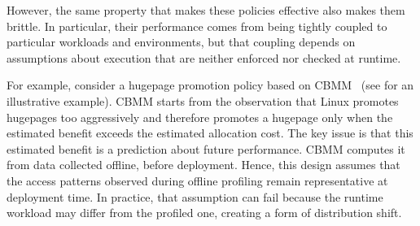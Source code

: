 
However, the same property that makes these policies effective also makes them brittle. In particular, their performance comes from being tightly coupled to particular workloads and environments, but that coupling depends on assumptions about execution that are neither enforced nor checked at runtime.

For example, consider a hugepage promotion policy based on CBMM~\cite{cbmm-atc22} (see  for an illustrative example). CBMM starts from the observation that Linux promotes hugepages too aggressively and  therefore promotes a hugepage only when the estimated benefit exceeds the estimated allocation cost. The key issue is that this estimated benefit is a prediction about future performance. CBMM computes it from data collected offline, before deployment. Hence, this design assumes that the access patterns observed during offline profiling remain representative at deployment time. In practice, that assumption can fail because the runtime workload may differ from the profiled one, creating a form of distribution shift. 

